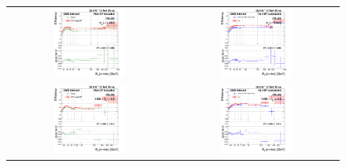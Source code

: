 \begin{figure}[htp]
  \begin{center}
    \begin{tabular}{cc}
      \includegraphics[width=0.45\textwidth]{figures/Zprime/2016/ScaleFactor/SameSign/nominal/g_compare_cut_Et_Barrel_ea_ta_inc_AS_nominal_PUW.png} &
      \includegraphics[width=0.45\textwidth]{figures/Zprime/2016/ScaleFactor/SameSign/nominal/g_compare_cut_Et_Barrel_ea_ta_exc_AS_nominal_PUW.png} \\
      \includegraphics[width=0.45\textwidth]{figures/Zprime/2016/ScaleFactor/SameSign/nominal/g_compare_cut_Et_Endcap_ea_ta_inc_AS_nominal_PUW.png} &
      \includegraphics[width=0.45\textwidth]{figures/Zprime/2016/ScaleFactor/SameSign/nominal/g_compare_cut_Et_Endcap_ea_ta_exc_AS_nominal_PUW.png}

\end{tabular}
\end{center}
\end{figure}
